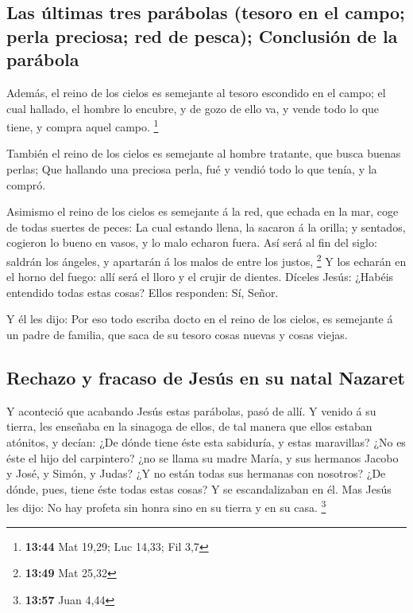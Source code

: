 \hypertarget{las-uxfaltimas-tres-paruxe1bolas-tesoro-en-el-campo-perla-preciosa-red-de-pesca-conclusiuxf3n-de-la-paruxe1bola}{%
\subsection{Las últimas tres parábolas (tesoro en el campo; perla
preciosa; red de pesca); Conclusión de la
parábola}\label{las-uxfaltimas-tres-paruxe1bolas-tesoro-en-el-campo-perla-preciosa-red-de-pesca-conclusiuxf3n-de-la-paruxe1bola}}

 Además, el reino de los cielos es semejante al tesoro
escondido en el campo; el cual hallado, el hombre lo encubre, y de gozo
de ello va, y vende todo lo que tiene, y compra aquel campo. \footnote{\textbf{13:44}
  Mat 19,29; Luc 14,33; Fil 3,7}

 También el reino de los cielos es semejante al hombre
tratante, que busca buenas perlas;  Que hallando una
preciosa perla, fué y vendió todo lo que tenía, y la compró.

 Asimismo el reino de los cielos es semejante á la red, que
echada en la mar, coge de todas suertes de peces:  La cual
estando llena, la sacaron á la orilla; y sentados, cogieron lo bueno en
vasos, y lo malo echaron fuera.  Así será al fin del siglo:
saldrán los ángeles, y apartarán á los malos de entre los justos,
\footnote{\textbf{13:49} Mat 25,32}  Y los echarán en el
horno del fuego: allí será el lloro y el crujir de dientes.
 Díceles Jesús: ¿Habéis entendido todas estas cosas? Ellos
responden: Sí, Señor.

 Y él les dijo: Por eso todo escriba docto en el reino de
los cielos, es semejante á un padre de familia, que saca de su tesoro
cosas nuevas y cosas viejas.

\hypertarget{rechazo-y-fracaso-de-jesuxfas-en-su-natal-nazaret}{%
\subsection{Rechazo y fracaso de Jesús en su natal
Nazaret}\label{rechazo-y-fracaso-de-jesuxfas-en-su-natal-nazaret}}

 Y aconteció que acabando Jesús estas parábolas, pasó de
allí.  Y venido á su tierra, les enseñaba en la sinagoga de
ellos, de tal manera que ellos estaban atónitos, y decían: ¿De dónde
tiene éste esta sabiduría, y estas maravillas?  ¿No es éste
el hijo del carpintero? ¿no se llama su madre María, y sus hermanos
Jacobo y José, y Simón, y Judas?  ¿Y no están todas sus
hermanas con nosotros? ¿De dónde, pues, tiene éste todas estas cosas?
 Y se escandalizaban en él. Mas Jesús les dijo: No hay
profeta sin honra sino en su tierra y en su casa. \footnote{\textbf{13:57}
  Juan 4,44}


